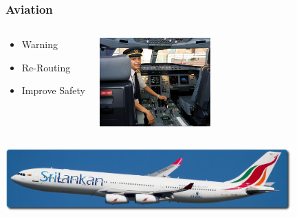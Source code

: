 \documentclass[serif,mathserif]{beamer}
\begin{document}
\begin{frame}
  \frametitle{Aviation}
\begin{columns}
\begin{center}
\begin{itemize}
 \item Warning
 \item Re-Routing
 \item Improve Safety
\end{itemize}
\end{center}

\begin{center}
 \includegraphics[width=4.25cm]{lk_pilot_female}
\end{center}
\end{columns}

\begin{columns}
\begin{center}
 \includegraphics[width=11cm]{srilankan_air}
\end{center}
\end{columns}
\end{frame}

\end{document}
